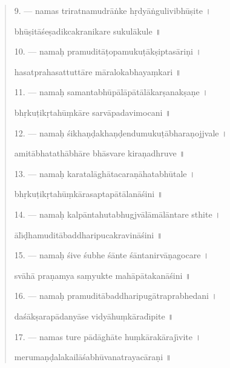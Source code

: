 \documentclass[a4paper, 11pt, oneside, french]{article}
\begin{document}
\begin{quotation}
9. --- namas triratnamudr\={a}\.{n}ke h\d{r}dy\={a}\.{n}gulivibh\={u}\d{s}ite \texthindi{।}

bh\={u}\d{s}it\={a}\'{s}e\d{s}adikcakranikare sukul\={a}kule \texthindi{॥}

\bigskip

10. --- nama\d{h} pramudit\={a}\d{t}opamuku\d{t}\={a}k\d{s}iptas\={a}ri\d{n}i \texthindi{।}

hasatprahasattutt\={a}re m\={a}ralokabhaya\d{m}kari \texthindi{॥}

\bigskip

11. --- nama\d{h} samantabh\={u}p\={a}l\={a}p\={a}t\={a}l\={a}kar\d{s}anak\d{s}a\d{n}e \texthindi{।}

bh\d{r}ku\d{t}ik\d{r}tah\={u}\d{m}k\={a}re sarv\={a}padavimocani \texthindi{॥}

\bigskip

12. --- nama\d{h} \'{s}ikha\d{n}\d{d}akha\d{n}\d{d}endumuku\d{t}\={a}bhara\d{n}ojjvale \texthindi{।}

amit\={a}bhatath\={a}bh\={a}re bh\={a}svare kira\d{n}adhruve \texthindi{॥}

\bigskip

13. --- nama\d{h} karatal\={a}gh\={a}tacara\d{n}\={a}hatabh\={u}tale \texthindi{।}

bh\d{r}ku\d{t}ik\d{r}tah\={u}\d{m}k\={a}rasaptap\={a}t\={a}lan\={a}\'{s}ini \texthindi{॥}

\bigskip

14. --- nama\d{h} kalp\={a}ntahutabhugjv\={a}l\={a}m\={a}l\={a}ntare sthite \texthindi{।}

\={a}l\={\i}\d{d}hamudit\={a}baddharipucakravin\={a}\'{s}ini \texthindi{॥}

\bigskip

15. --- nama\d{h} \'{s}ive \'{s}ubhe \'{s}\={a}nte \'{s}\={a}ntanirv\={a}\d{n}agocare \texthindi{।}

sv\={a}h\={a} pra\d{n}amya sa\d{m}yukte mah\={a}p\={a}takan\={a}\'{s}ini \texthindi{॥}

\bigskip

16. --- nama\d{h} pramudit\={a}baddharipug\={a}traprabhedani \texthindi{।}

da\'{s}\={a}k\d{s}arap\={a}dany\={a}se vidy\={a}hu\d{m}k\={a}rad\={\i}pite \texthindi{॥}

\bigskip

17. --- namas ture p\={a}d\={a}gh\={a}te hu\d{m}k\={a}rak\={a}raj\={\i}vite \texthindi{।}

meruma\d{n}\d{d}alakail\={a}\'{s}abh\={u}vanatrayac\={a}ra\d{n}i \texthindi{॥}


\end{quotation}
\end{document}
